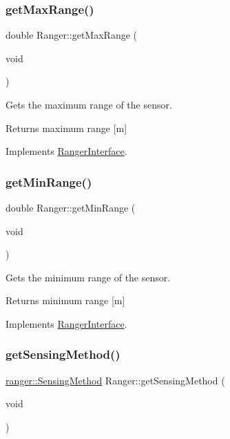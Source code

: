 \subsubsection{\texorpdfstring{get\+Max\+Range()}{getMaxRange()}}
{\footnotesize\ttfamily double Ranger\+::get\+Max\+Range (\begin{DoxyParamCaption}\item[{void}]{ }\end{DoxyParamCaption})\hspace{0.3cm}{\ttfamily [virtual]}}



Gets the maximum range of the sensor. 

\begin{DoxyReturn}{Returns}
maximum range \mbox{[}m\mbox{]} 
\end{DoxyReturn}


Implements \hyperlink{classRangerInterface_a0bb29a41de5767c99081002c0590c186}{Ranger\+Interface}.

\mbox{\label{classRanger_a646a06d3916179b9ebc4502bad169eec}} 
\subsubsection{\texorpdfstring{get\+Min\+Range()}{getMinRange()}}
{\footnotesize\ttfamily double Ranger\+::get\+Min\+Range (\begin{DoxyParamCaption}\item[{void}]{ }\end{DoxyParamCaption})\hspace{0.3cm}{\ttfamily [virtual]}}



Gets the minimum range of the sensor. 

\begin{DoxyReturn}{Returns}
minimum range \mbox{[}m\mbox{]} 
\end{DoxyReturn}


Implements \hyperlink{classRangerInterface_ae6d501ddeeaad4a7b44d7d51ce64cb88}{Ranger\+Interface}.

\mbox{\label{classRanger_a47e30b7ec55adec5bb542278ccfee140}} 
\subsubsection{\texorpdfstring{get\+Sensing\+Method()}{getSensingMethod()}}
{\footnotesize\ttfamily \hyperlink{namespaceranger_ab04465c229cc50595ffe40a891a3b135}{ranger\+::\+Sensing\+Method} Ranger\+::get\+Sensing\+Method (\begin{DoxyParamCaption}\item[{void}]{ }\end{DoxyParamCaption})\hspace{0.3cm}{\ttfamily [virtual]}}



